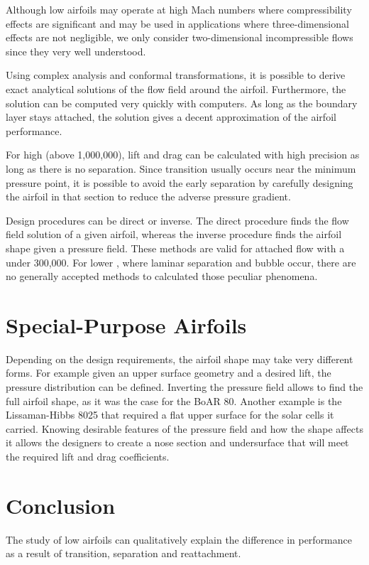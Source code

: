\documentclass[letterpaper,12pt,]{article}
\begin{document}
Although low \rn airfoils may operate at high Mach numbers where compressibility effects are significant and may be used in applications where three-dimensional effects are not negligible, we only consider two-dimensional incompressible flows since they very well understood.

Using complex analysis and conformal transformations, it is possible to derive exact analytical solutions of the flow field around the airfoil. Furthermore, the solution can be computed very quickly with computers. As long as the boundary layer stays attached, the solution gives a decent approximation of the airfoil performance. 

For high \rn (above 1,000,000), lift and drag can be calculated with high precision as long as there is no separation. Since transition usually occurs near the minimum pressure point, it is possible to avoid the early separation by carefully designing the airfoil in that section to reduce the adverse pressure gradient.

Design procedures can be direct or inverse. The direct procedure finds the flow field solution of a given airfoil, whereas the inverse procedure finds the airfoil shape given a pressure field. These methods are valid for attached flow with a \rn under 300,000. For lower \rn, where laminar separation and bubble occur, there are no generally accepted methods to calculated those peculiar phenomena.

\section{Special-Purpose Airfoils}

Depending on the design requirements, the airfoil shape may take very different forms. For example given an upper surface geometry and a desired lift, the pressure distribution can be defined. Inverting the pressure field allows to find the full airfoil shape, as it was the case for the BoAR 80. Another example is the Lissaman-Hibbs 8025 that required a flat upper surface for the solar cells it carried. Knowing desirable features of the pressure field and how the shape affects it allows the designers to create a nose section and undersurface that will meet the required lift and drag coefficients.

\section{Conclusion}

The study of low \rn airfoils can qualitatively explain the difference in performance as a result of transition, separation and reattachment. 
\end{document}
